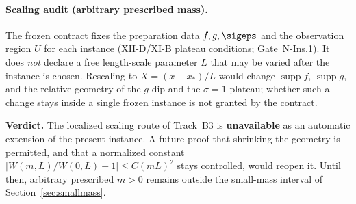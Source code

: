 \paragraph{Scaling audit (arbitrary prescribed mass).}
\label{sec:scaling}
The frozen contract fixes the preparation data $f,g,\sigeps$ and the observation
region $U$ for each instance (XII-D/XI-B plateau conditions; Gate~N-Ins.1). It does
\emph{not} declare a free length-scale parameter $L$ that may be varied after the
instance is chosen. Rescaling to $X=(x-x_*)/L$ would change $\operatorname{supp}f$,
$\operatorname{supp}g$, and the relative geometry of the $g$-dip and the $\sigma=1$
plateau; whether such a change stays inside a single frozen instance is not
granted by the contract.

\textbf{Verdict.} The localized scaling route of Track~B3 is \textbf{unavailable}
as an automatic extension of the present instance. A future proof that shrinking
the geometry is permitted, and that a normalized constant
$|W(m,L)/W(0,L)-1|\le C(mL)^2$ stays controlled, would reopen it. Until then,
arbitrary prescribed $m>0$ remains outside the small-mass interval of
Section~\ref{sec:smallmass}.
